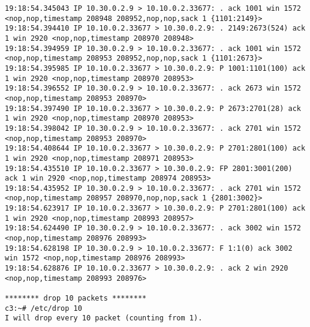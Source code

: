 \documentclass[a4paper,12pt]{article}
\begin{document}
\begin{lstlisting}
19:18:54.345043 IP 10.30.0.2.9 > 10.10.0.2.33677: . ack 1001 win 1572 <nop,nop,timestamp 208948 208952,nop,nop,sack 1 {1101:2149}>
19:18:54.394410 IP 10.10.0.2.33677 > 10.30.0.2.9: . 2149:2673(524) ack 1 win 2920 <nop,nop,timestamp 208970 208948>
19:18:54.394959 IP 10.30.0.2.9 > 10.10.0.2.33677: . ack 1001 win 1572 <nop,nop,timestamp 208953 208952,nop,nop,sack 1 {1101:2673}>
19:18:54.395985 IP 10.10.0.2.33677 > 10.30.0.2.9: P 1001:1101(100) ack 1 win 2920 <nop,nop,timestamp 208970 208953>
19:18:54.396552 IP 10.30.0.2.9 > 10.10.0.2.33677: . ack 2673 win 1572 <nop,nop,timestamp 208953 208970>
19:18:54.397490 IP 10.10.0.2.33677 > 10.30.0.2.9: P 2673:2701(28) ack 1 win 2920 <nop,nop,timestamp 208970 208953>
19:18:54.398042 IP 10.30.0.2.9 > 10.10.0.2.33677: . ack 2701 win 1572 <nop,nop,timestamp 208953 208970>
19:18:54.408644 IP 10.10.0.2.33677 > 10.30.0.2.9: P 2701:2801(100) ack 1 win 2920 <nop,nop,timestamp 208971 208953>
19:18:54.435510 IP 10.10.0.2.33677 > 10.30.0.2.9: FP 2801:3001(200) ack 1 win 2920 <nop,nop,timestamp 208974 208953>
19:18:54.435952 IP 10.30.0.2.9 > 10.10.0.2.33677: . ack 2701 win 1572 <nop,nop,timestamp 208957 208970,nop,nop,sack 1 {2801:3002}>
19:18:54.623917 IP 10.10.0.2.33677 > 10.30.0.2.9: P 2701:2801(100) ack 1 win 2920 <nop,nop,timestamp 208993 208957>
19:18:54.624490 IP 10.30.0.2.9 > 10.10.0.2.33677: . ack 3002 win 1572 <nop,nop,timestamp 208976 208993>
19:18:54.628198 IP 10.30.0.2.9 > 10.10.0.2.33677: F 1:1(0) ack 3002 win 1572 <nop,nop,timestamp 208976 208993>
19:18:54.628876 IP 10.10.0.2.33677 > 10.30.0.2.9: . ack 2 win 2920 <nop,nop,timestamp 208993 208976>

******** drop 10 packets ********
c3:~# /etc/drop 10
I will drop every 10 packet (counting from 1).


\end{lstlisting}
\end{document}
